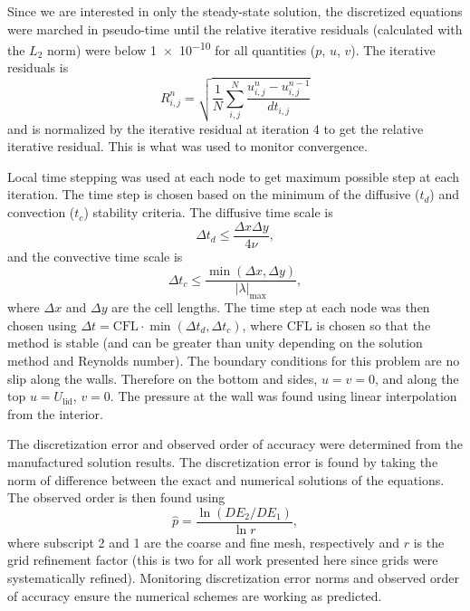 \documentclass[10pt, letterpaper]{article}
\begin{document}
Since we are interested in only the steady-state solution, the discretized equations
were marched in pseudo-time until the relative iterative residuals (calculated
with the $L_2$ norm) were below \num{1e-10} for all quantities ($p$, $u$, $v$).
The iterative residuals is
%
\begin{equation} \label{eqn:resid}
	R_{i,j}^n = \sqrt{\frac{1}{N} \sum_{i,j}^N 
		\frac{u_{i,j}^n - u_{i,j}^{n-1}}{dt_{i,j}}}
\end{equation}
%
and is normalized by the iterative residual at iteration 4 to get the relative
iterative residual.  This is what was used to monitor convergence.

Local time stepping was used at each node to get maximum possible step at
each iteration.  The time step is chosen based on the minimum of the
diffusive ($t_d$) and convection ($t_c$) stability criteria.  The diffusive
time scale is
%
\begin{equation*}
	\Delta t_d \leq \frac{\Delta x \Delta y}{4 \nu},
\end{equation*}
%
and the convective time scale is
\begin{equation*}
	\Delta t_c \leq \frac{\min(\Delta x, \Delta y)}{|\lambda|_\mathrm{max}},
\end{equation*}
%
where $\Delta x$ and $\Delta y$ are the cell lengths.  The time step at each node
was then chosen using $\Delta	 t = \mathrm{CFL} \cdot \min(\Delta t_d, \Delta t_c)$,
where $\mathrm{CFL}$ is chosen so that the method is stable (and can be greater
than unity depending on the solution method and Reynolds number).
The boundary conditions for this problem are no slip along the walls.  Therefore
on the bottom and sides, $u=v=0$, and along the top $u=U_\mathrm{lid}$, $v=0$.
The pressure at the wall was found using linear interpolation from the
interior.

The discretization error and observed order of accuracy were determined from
the manufactured solution results.  The discretization error is found by
taking the norm of difference between the exact and numerical solutions of
the equations.  The observed order is then found using
%
\begin{equation} \label{eqn:ooa}
	\hat{p} = \frac{\ln(DE_2/DE_1)}{\ln r},
\end{equation}
%
where subscript 2 and 1 are the coarse and fine mesh, respectively and $r$
is the grid refinement factor (this is two for all work presented here since
grids were systematically refined).  Monitoring discretization error norms
and observed order of accuracy ensure the numerical schemes are working as
predicted.
\end{document}
